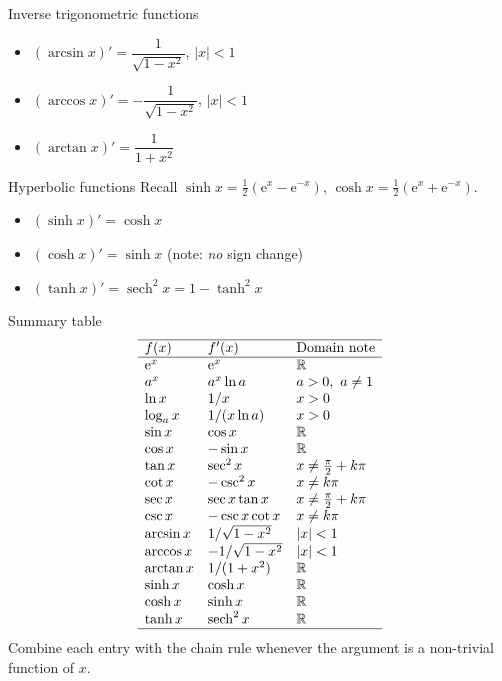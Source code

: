 \begin{rulebox}{Inverse trigonometric functions}
\begin{itemize}[leftmargin=1.6em,itemsep=0.3ex]
  \item $(\arcsin x)'=\dfrac{1}{\sqrt{1-x^{2}}}$, \quad $|x|<1$
  \item $(\arccos x)'=-\dfrac{1}{\sqrt{1-x^{2}}}$, \quad $|x|<1$
  \item $(\arctan x)'=\dfrac{1}{1+x^{2}}$
\end{itemize}
\end{rulebox}

\begin{rulebox}{Hyperbolic functions}
Recall $\sinh x=\tfrac12(\mathrm{e}^{x}-\mathrm{e}^{-x})$,
$\cosh x=\tfrac12(\mathrm{e}^{x}+\mathrm{e}^{-x})$.
\begin{itemize}[leftmargin=1.6em,itemsep=0.3ex]
  \item $(\sinh x)'=\cosh x$
  \item $(\cosh x)'=\sinh x$ \quad (note: \emph{no} sign change)
  \item $(\tanh x)'=\operatorname{sech}^{2}x=1-\tanh^{2}x$
\end{itemize}
\end{rulebox}

\begin{rulebox}{Summary table}
\[
\begin{array}{lll}
\hline
f(x) & f'(x) & \text{Domain note} \\
\hline
\mathrm{e}^{x} & \mathrm{e}^{x} & \mathbb{R} \\
a^{x} & a^{x}\ln a & a>0,\ a\neq 1 \\
\ln x & 1/x & x>0 \\
\log_{a}x & 1/(x\ln a) & x>0 \\
\sin x & \cos x & \mathbb{R} \\
\cos x & -\sin x & \mathbb{R} \\
\tan x & \sec^{2}x & x\neq \tfrac{\pi}{2}+k\pi \\
\cot x & -\csc^{2}x & x\neq k\pi \\
\sec x & \sec x\tan x & x\neq \tfrac{\pi}{2}+k\pi \\
\csc x & -\csc x\cot x & x\neq k\pi \\
\arcsin x & 1/\sqrt{1-x^{2}} & |x|<1 \\
\arccos x & -1/\sqrt{1-x^{2}} & |x|<1 \\
\arctan x & 1/(1+x^{2}) & \mathbb{R} \\
\sinh x & \cosh x & \mathbb{R} \\
\cosh x & \sinh x & \mathbb{R} \\
\tanh x & \operatorname{sech}^{2}x & \mathbb{R} \\
\hline
\end{array}
\]
Combine each entry with the chain rule whenever the argument is a
non-trivial function of $x$.
\end{rulebox}

